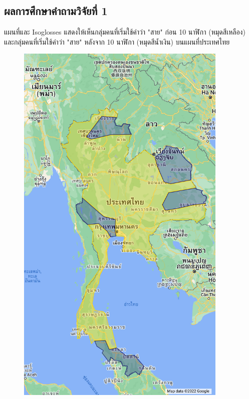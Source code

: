 \documentclass[a4paper]{article}
\begin{document}
\subsection{ผลการศึกษาคำถามวิจัยที่ 1}
    แผนที่และ Isoglosses แสดงให้เห็นกลุ่มคนที่เริ่มใช้คำว่า "สาย" ก่อน 10 นาฬิกา (หมุดสีเหลือง) และกลุ่มคนที่เริ่มใช้คำว่า "สาย" หลังจาก 10 นาฬิกา (หมุดสีน้ำเงิน) บนแผนที่ประเทศไทย
    \begin{figure}[!ht]
        \begin{center}
        \begin{minipage}{0.45\textwidth}
            \includegraphics[width=0.9\textwidth]{map_no_dot}
        \end{minipage}

\end{center}
\end{figure}
\end{document}
